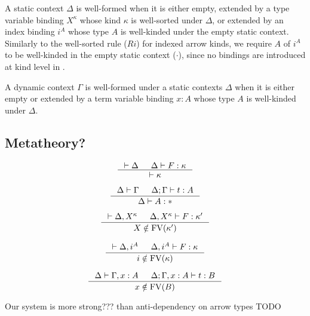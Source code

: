 A static context $\Delta$ is well-formed when it is either empty, extended by
a type variable binding $X^\kappa$ whose kind $\kappa$ is well-sorted
under $\Delta$, or extended by an index binding $i^A$ whose type $A$ is
well-kinded under the empty static context. Similarly to the well-sorted rule
($Ri$) for indexed arrow kinds, we require $A$ of $i^A$ to be well-kinded in
the empty static context ($\cdot$), since no bindings are introduced
at kind level in \Fi.

A dynamic context $\Gamma$ is well-formed under a static contexts $\Delta$
when it is either empty or extended by a term variable binding $x:A$ whose
type $A$ is well-kinded under $\Delta$.


\subsection{Metatheory?}

\begin{proposition}
\[ \inference{ |- \Delta & \Delta |- F : \kappa}{ |- \kappa }
\]
\end{proposition}

\begin{proposition}
\[ \inference{ \Delta |- \Gamma & \Delta;\Gamma |- t : A}{ \Delta |- A : * }
\]
\end{proposition}

\begin{proposition}
\[ \inference{ |- \Delta,X^\kappa
             & \Delta,X^\kappa |- F : \kappa' }
             { X\notin\FV(\kappa') }
\]
\end{proposition}

\begin{proposition}
\[ \inference{ |- \Delta,i^A
             & \Delta,i^A |- F : \kappa }
             { i\notin\FV(\kappa) }
\]
\end{proposition}

\begin{proposition}
\[ \inference{ \Delta |- \Gamma,x:A
             & \Delta;\Gamma,x:A |- t : B }
             { x\notin\FV(B) }
\]
\end{proposition}

\begin{remark} Our system is more strong??? than anti-dependency on arrow types
TODO
\end{remark}

